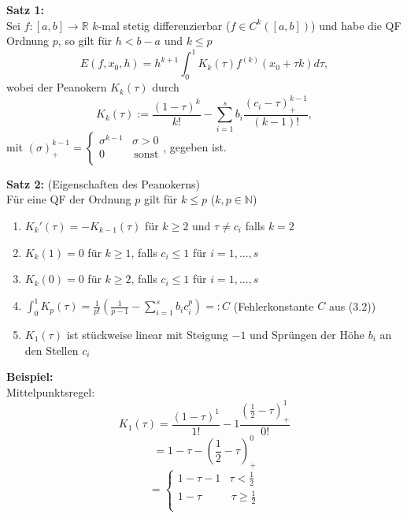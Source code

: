 \begin{nothing}
\begin{description}
  \item
\end{description}
\begin{description}
  \item \textbf{Satz 1:} \\
    Sei $f: [a, b] \rightarrow \mathbb{R}$ $k$-mal stetig differenzierbar ($f \in C^k([a, b])$) und habe die QF Ordnung $p$, so gilt für $h < b-a$ und $k \leq p$\\
    $$E(f, x_0, h) = h^{k+1} \int_0^1 K_k(\tau) f^{(k)}(x_0+\tau k) d\tau,$$
    wobei der Peanokern $K_k(\tau)$ durch 
    $$ K_k(\tau) := \frac{(1-\tau)^k}{k!} - \sum_{i=1}^s b_i \frac{(c_i - \tau)^{k-1}_+}{(k-1)!}, $$
    mit 
    $(\sigma)_+^{k-1} = \left\{
    \begin{array}{ll}
    \sigma ^{k-1} &  \sigma > 0 \\
    0 & \, \textrm{sonst} \\
    \end{array}
    \right. $, gegeben ist.
      
  \item \textbf{Satz 2:} (Eigenschaften des Peanokerns) \\
    Für eine QF der Ordnung $p$ gilt für $k \leq p$ ($k, p \in \mathbb{N}$) 
    \begin{enumerate}
      \item $K_k'(\tau) = -K_{k-1}(\tau)$ für $k \geq 2$ und $\tau \neq c_i$ falls $k=2$
      \item $K_k(1) = 0$ für $k \geq 1$, falls $c_i \leq 1$ für $i=1,..., s$
      \item $K_k(0) = 0$ für $k \geq 2$, falls $c_i \leq 1$ für $i=1,..., s$
      \item $\int_0^1 K_p(\tau) = \frac{1}{p!} \left(\frac{1}{p-1} - \sum_{i=1}^s b_i c_i^p \right)=: C$ (Fehlerkonstante $C$ aus (3.2))
      \item $K_1(\tau)$ ist stückweise linear mit Steigung $-1$ und Sprüngen der Höhe $b_i$ an den Stellen $c_i$
    \end{enumerate}
  
  \item \textbf{Beispiel:} \\
    Mittelpunktsregel: 
      $$K_1(\tau) = \frac{(1-\tau)^1}{1!} - 1 \frac{(\frac{1}{2} - \tau)^1_+}{0!}$$
      $$= 1- \tau - \left( \frac{1}{2} - \tau \right)_+^0$$
      $$ = \left\{
        \begin{array}{ll}
        1-\tau - 1  & \tau < \frac{1}{2} \\
        1-\tau & \, \tau \geq \frac{1}{2} \\
        \end{array}
      \right. $$
      

\end{description}
\end{nothing}
